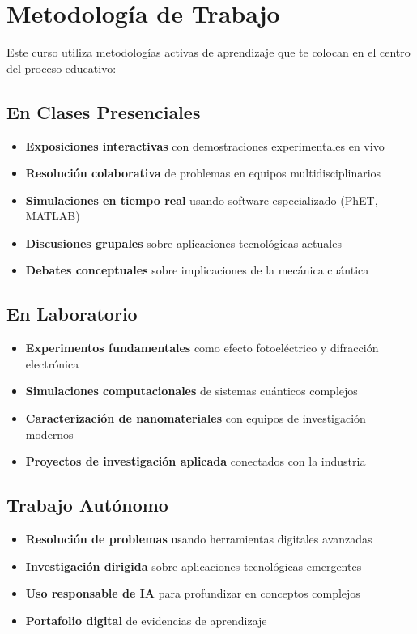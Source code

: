 \documentclass[12pt,a4paper]{book}
\begin{document}
	\section{Metodología de Trabajo}
	
	Este curso utiliza metodologías activas de aprendizaje que te colocan en el centro del proceso educativo:
	
	\subsection{En Clases Presenciales}
	
	\begin{itemize}
		\item \textbf{Exposiciones interactivas} con demostraciones experimentales en vivo
		\item \textbf{Resolución colaborativa} de problemas en equipos multidisciplinarios
		\item \textbf{Simulaciones en tiempo real} usando software especializado (PhET, MATLAB)
		\item \textbf{Discusiones grupales} sobre aplicaciones tecnológicas actuales
		\item \textbf{Debates conceptuales} sobre implicaciones de la mecánica cuántica
	\end{itemize}
	
	\subsection{En Laboratorio}
	
	\begin{itemize}
		\item \textbf{Experimentos fundamentales} como efecto fotoeléctrico y difracción electrónica
		\item \textbf{Simulaciones computacionales} de sistemas cuánticos complejos
		\item \textbf{Caracterización de nanomateriales} con equipos de investigación modernos
		\item \textbf{Proyectos de investigación aplicada} conectados con la industria
	\end{itemize}
	
	\subsection{Trabajo Autónomo}
	
	\begin{itemize}
		\item \textbf{Resolución de problemas} usando herramientas digitales avanzadas
		\item \textbf{Investigación dirigida} sobre aplicaciones tecnológicas emergentes
		\item \textbf{Uso responsable de IA} para profundizar en conceptos complejos
		\item \textbf{Portafolio digital} de evidencias de aprendizaje
	\end{itemize}
	
\end{document}
